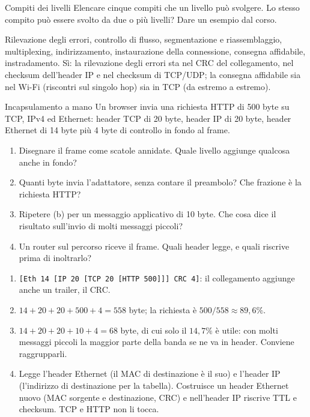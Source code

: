 \begin{esercizio}{Compiti dei livelli}
Elencare cinque compiti che un livello può svolgere. Lo stesso compito può essere svolto da due o più livelli? Dare un esempio dal corso.

\svolgimento
Rilevazione degli errori, controllo di flusso, segmentazione e riassemblaggio, multiplexing, indirizzamento, instaurazione della
connessione, consegna affidabile, instradamento. Sì: la rilevazione degli errori sta nel CRC del collegamento, nel checksum dell'header
IP e nel checksum di TCP/UDP; la consegna affidabile sia nel Wi-Fi (riscontri sul singolo hop) sia in TCP (da estremo a estremo).
\end{esercizio}

\begin{esercizio}{Incapsulamento a mano}
Un browser invia una richiesta HTTP di 500 byte su TCP, IPv4 ed Ethernet: header TCP di 20 byte, header IP di 20 byte, header Ethernet di
14 byte più 4 byte di controllo in fondo al frame.
\begin{enumerate}[label=(\alph*)]
    \item Disegnare il frame come scatole annidate. Quale livello aggiunge qualcosa anche in fondo?
    \item Quanti byte invia l'adattatore, senza contare il preambolo? Che frazione è la richiesta HTTP?
    \item Ripetere (b) per un messaggio applicativo di 10 byte. Che cosa dice il risultato sull'invio di molti messaggi piccoli?
    \item Un router sul percorso riceve il frame. Quali header legge, e quali riscrive prima di inoltrarlo?
\end{enumerate}

\svolgimento
\begin{enumerate}[label=(\alph*)]
    \item \texttt{[Eth 14 [IP 20 [TCP 20 [HTTP 500]]] CRC 4]}: il collegamento aggiunge anche un trailer, il CRC.
    \item $14 + 20 + 20 + 500 + 4 = 558$ byte; la richiesta è $500/558 \approx 89{,}6\%$.
    \item $14 + 20 + 20 + 10 + 4 = 68$ byte, di cui solo il $14{,}7\%$ è utile: con molti messaggi piccoli la maggior parte della banda se
          ne va in header. Conviene raggrupparli.
    \item Legge l'header Ethernet (il MAC di destinazione è il suo) e l'header IP (l'indirizzo di destinazione per la tabella). Costruisce
          un header Ethernet nuovo (MAC sorgente e destinazione, CRC) e nell'header IP riscrive TTL e checksum. TCP e HTTP non li tocca.
\end{enumerate}
\end{esercizio}

